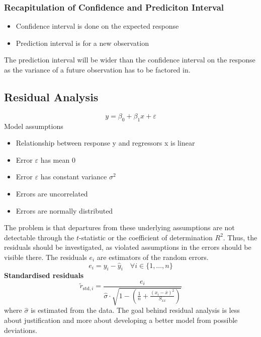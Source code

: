 \documentclass[11pt]{article}
\theoremstyle{definition}
\newcommand*\samplemean[1]{\overline{#1}}
\begin{document}
\subsubsection{Recapitulation of Confidence and Prediciton Interval}
\begin{itemize}
	\item Confidence interval is done on the expected response
	\item Prediction interval is for a new observation
\end{itemize}
The prediction interval will be wider than the confidence interval on the response as the variance of a future observation has to be factored in.

\clearpage

\subsection{Residual Analysis}
\begin{equation*}
	y = \beta_0 + \beta_1 x + \varepsilon
\end{equation*}
Model assumptions
\begin{itemize}
	\item Relationship between response y and regressors x is linear
	\item Error $\varepsilon$ has mean $0$
	\item Error $\varepsilon$ has constant variance $\sigma^2$
	\item Errors are uncorrelated
	\item Errors are normally distributed
\end{itemize}
The problem is that departures from these underlying assumptions are not detectable through the $t$-statistic or the coefficient of determination $R^2$. Thus, the residuals should be investigated, as violated assumptions in the errors should be visible there. The residuals $e_i$ are estimators of the random errors.
\begin{equation*}
	e_i = y_i - \hat{y}_i \quad\forall i\in\{1,\dots,n\}
\end{equation*}
\textbf{Standardised residuals}
\begin{equation*}
	\tilde{r}_{\text{std}, i} = \frac{e_i}{\hat{\sigma} \cdot \sqrt{1-\left(\frac{1}{n} + \frac{(x_i - \samplemean{x})^2}{S_{xx}}\right)}}
\end{equation*}
where $\hat{\sigma}$ is estimated from the data. The goal behind residual analysis is less about justification and more about developing a better model from possible deviations.
\end{document}
